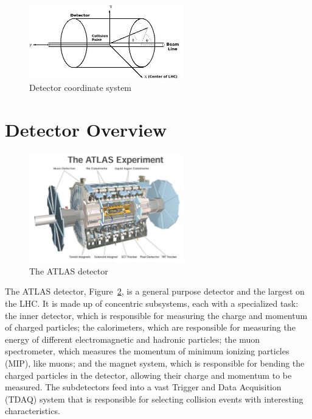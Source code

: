\begin{figure}[h]
\begin{center}
\includegraphics*[width=0.60\textwidth] {figures/coordinate}
\caption[Detector coordinate system]{Detector coordinate system \cite{phdthesis}}
\label{fig:coord}
\end{center}
\end{figure}



\section{Detector Overview}
\begin{figure}[h]
\begin{center}
\includegraphics*[width=0.60\textwidth] {figures/ATLAS_det}
\caption[The ATLAS detector]{The ATLAS detector \cite{Collaboration_2008}}
\label{fig:ATLAS_det}
\end{center}
\end{figure}
The ATLAS detector, Figure~\ref{fig:ATLAS_det}, is a general purpose detector and the largest on the LHC.  It is made up of concentric subsystems, each with a specialized task: the inner detector, which is responsible for measuring the charge and momentum of charged particles; the calorimeters, which are responsible for measuring the energy of different electromagnetic and hadronic particles; the muon spectrometer, which measures the momentum of minimum ionizing particles (MIP), like muons; and the magnet system, which is responsible for bending the charged particles in the detector, allowing their charge and momentum to be measured. The subdetectors feed into a vast Trigger and Data Acquisition (TDAQ) system that is responsible for selecting collision events with interesting characteristics.


